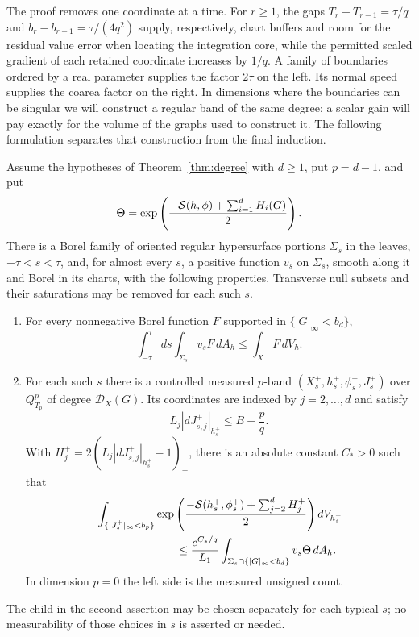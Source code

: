 The proof removes one coordinate at a time.  For $r\ge1$, the gaps
$T_r-T_{r-1}=\tau/q$ and $b_r-b_{r-1}=\tau/(4q^2)$ supply, respectively,
chart buffers and room for the residual value error when locating the
integration core, while the permitted scaled gradient of each retained
coordinate increases by $1/q$.  A family of boundaries
ordered by a real parameter supplies the factor $2\tau$ on the left.
Its normal speed supplies the coarea factor on the right.  In dimensions
where the boundaries can be singular we will construct a regular band
of the same degree; a scalar gain will pay exactly for the volume of the
graphs used to construct it.  The following formulation separates that
construction from the final induction.

\begin{lemma}\label{lem:degree-descent}
Assume the hypotheses of Theorem~\ref{thm:degree} with $d\ge1$, put
$p=d-1$, and put
\[
       \Theta=\exp\left(\frac{-\mathcal S(h,\phi)+\sum_{i=1}^dH_i(G)}2\right).
\]
There is a Borel family of oriented regular hypersurface portions
$\Sigma_s$ in the leaves, $-\tau<s<\tau$, and, for almost every $s$, a
positive function $v_s$ on $\Sigma_s$, smooth along it and Borel in its
charts, with the following properties.  Transverse null subsets and their
saturations may be removed for each such $s$.
\begin{enumerate}
\item For every nonnegative Borel function $F$ supported in
$\{|G|_\infty<b_d\}$,
\begin{equation}\label{eq:degree-coarea}
 \int_{-\tau}^{\tau}\!ds\int_{\Sigma_s}v_sF\,dA_h
                       \le\int_XF\,dV_h.
\end{equation}
\item For each such $s$ there is a controlled measured $p$-band
$(X_s^+,h_s^+,\phi_s^+,J_s^+)$ over $Q_{T_p}^p$ of degree
$\mathcal D_X(G)$.  Its coordinates are indexed by $j=2,\ldots,d$ and
satisfy
\[
             L_j|dJ_{s,j}^+|_{h_s^+}\le B-\frac pq.
\]
With $H_j^+=2(L_j|dJ_{s,j}^+|_{h_s^+}-1)_+$, there is an absolute constant
$C_*>0$ such that
\begin{equation}\label{eq:degree-child-integral}
 \begin{split}
 &\int_{\{|J_s^+|_\infty<b_p\}}
        \exp\left(\frac{-\wscal(h_s^+,\phi_s^+)+\sum_{j=2}^dH_j^+}{2}\right)
        dV_{h_s^+}\\
 &\hspace{25mm}\le \frac{e^{C_*/q}}{L_1}
       \int_{\Sigma_s\cap\{|G|_\infty<b_d\}}v_s\Theta\,dA_h.
 \end{split}
\end{equation}
In dimension $p=0$ the left side is the measured unsigned count.
\end{enumerate}
The child in the second assertion may be chosen separately for each
typical $s$; no measurability of those choices in $s$ is asserted or needed.
\end{lemma}

